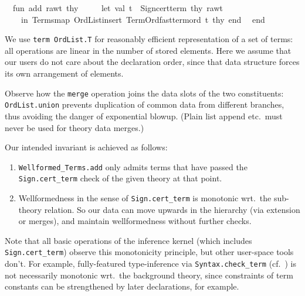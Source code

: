 \begin{isabellebody}
\isanewline
\ \ fun\ add\ raw{\isacharunderscore}t\ thy\ {\isacharequal}\isanewline
\ \ \ \ let\ val\ t\ {\isacharequal}\ Sign{\isachardot}cert{\isacharunderscore}term\ thy\ raw{\isacharunderscore}t\isanewline
\ \ \ \ in\ Terms{\isachardot}map\ {\isacharparenleft}OrdList{\isachardot}insert\ TermOrd{\isachardot}fast{\isacharunderscore}term{\isacharunderscore}ord\ t{\isacharparenright}\ thy\ end{\isacharsemicolon}\isanewline
\isanewline
\ \ end{\isacharsemicolon}\isanewline
{\isacharverbatimclose}%
\endisatagML
{\isafoldML}%
%
\isadelimML
%
\endisadelimML
%
\begin{isamarkuptext}%
We use \verb|term OrdList.T| for reasonably efficient
  representation of a set of terms: all operations are linear in the
  number of stored elements.  Here we assume that our users do not
  care about the declaration order, since that data structure forces
  its own arrangement of elements.

  Observe how the \verb|merge| operation joins the data slots of
  the two constituents: \verb|OrdList.union| prevents duplication of
  common data from different branches, thus avoiding the danger of
  exponential blowup.  (Plain list append etc.\ must never be used for
  theory data merges.)

  \medskip Our intended invariant is achieved as follows:
  \begin{enumerate}

  \item \verb|Wellformed_Terms.add| only admits terms that have passed
  the \verb|Sign.cert_term| check of the given theory at that point.

  \item Wellformedness in the sense of \verb|Sign.cert_term| is
  monotonic wrt.\ the sub-theory relation.  So our data can move
  upwards in the hierarchy (via extension or merges), and maintain
  wellformedness without further checks.

  \end{enumerate}

  Note that all basic operations of the inference kernel (which
  includes \verb|Sign.cert_term|) observe this monotonicity principle,
  but other user-space tools don't.  For example, fully-featured
  type-inference via \verb|Syntax.check_term| (cf.\
  ) is not necessarily monotonic wrt.\ the
  background theory, since constraints of term constants can be
  strengthened by later declarations, for example.


\end{isamarkuptext}
\end{isabellebody}
